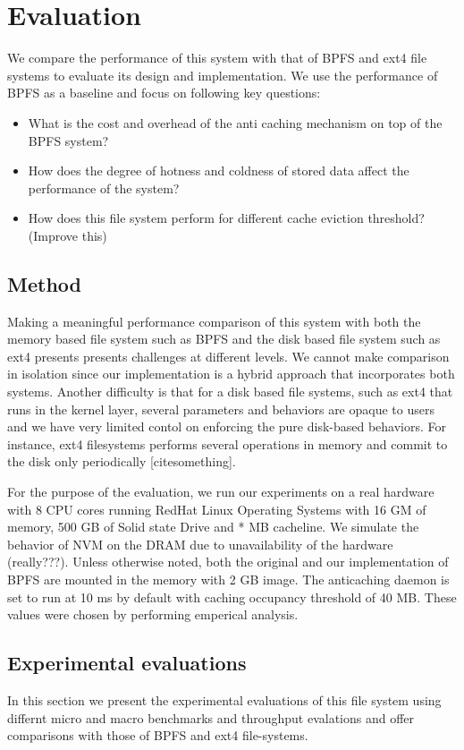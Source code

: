 \section{Evaluation}
We compare the performance of this system with that of BPFS and ext4 file systems to evaluate its design and implementation. We use the performance of BPFS as a baseline and focus on following key questions:
\begin{itemize}
\item What is the cost and overhead of the anti caching mechanism on top of the BPFS system?
\item How does the degree of hotness and coldness of stored data affect the performance of the system?
\item How does this file system perform for different cache eviction threshold? (Improve this)
\end{itemize}

\subsection{Method}
Making a meaningful performance comparison of this system with both the memory based file system such as BPFS and the disk based file system such as ext4 presents presents challenges at different levels. We cannot make comparison in isolation since our implementation is a hybrid approach that incorporates both systems. Another difficulty is that for a disk based file systems, such as ext4 that runs in the kernel layer, several parameters and behaviors are opaque to users and we have very limited contol on enforcing the pure disk-based behaviors. For instance, ext4 filesystems performs several operations in memory and commit to the disk only periodically [cite{something}]. 

For the purpose of the evaluation, we run our experiments on a real hardware with 8 CPU cores running RedHat Linux Operating Systems with 16 GM of memory, 500 GB of Solid state Drive and * MB cacheline. We simulate the behavior of NVM on the DRAM due to unavailability of the hardware (really???). Unless otherwise noted, both the original and our implementation of BPFS are mounted in the memory with 2 GB image. The anticaching daemon is set to run at 10 ms by default with caching occupancy threshold of 40 MB. These values were chosen by performing emperical analysis.    

\subsection{Experimental evaluations}
In this section we present the experimental evaluations of this file system using differnt micro and macro benchmarks and throughput evalations and offer comparisons with those of BPFS and ext4 file-systems. 


